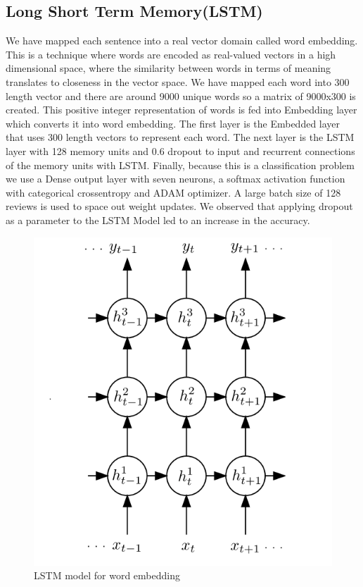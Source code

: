 \documentclass[conference]{IEEEtran}
\numberwithin{equation}{section}
\numberwithin{figure}{section}
\numberwithin{table}{section}
\begin{document}
\subsection {Long Short Term Memory(LSTM)\cite{lstm}}
We have mapped each sentence into a real vector domain called word embedding. This is a technique where words are encoded as real-valued vectors in a high dimensional space, where the similarity between words in terms of meaning translates to closeness in the vector space.
We have mapped each word into 300 length vector and there are around 9000 unique words so a matrix of 9000x300 is created. This positive integer representation of words is fed into Embedding layer which converts it into word embedding.
The first layer is the Embedded layer that uses 300 length vectors to represent each word. The next layer is the LSTM layer with 128 memory units and 0.6 dropout to input and recurrent connections of the memory units with LSTM. Finally, because this is a classification problem we use a Dense output layer with seven neurons, a softmax activation function with categorical crossentropy and ADAM optimizer. A large batch size of 128 reviews is used to space out weight updates.  We observed that applying dropout as a parameter to the LSTM Model led to an increase in the accuracy.
\begin{figure}
  \centering
  \includegraphics[width=\columnwidth]{LSTM_image}
  \caption{LSTM model for word embedding}
    \label{lstm}
\end{figure}
\end{document}
